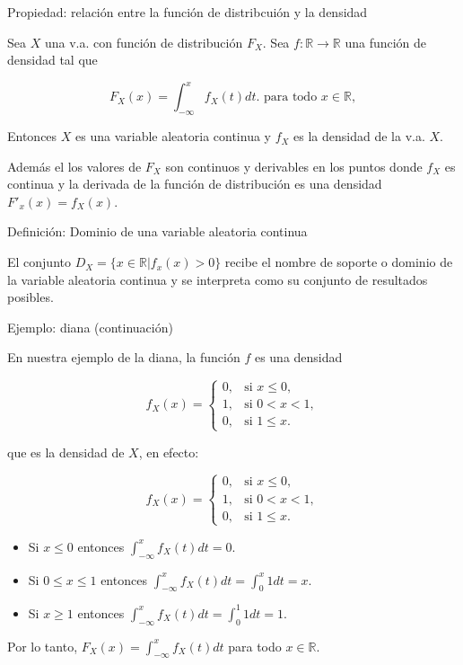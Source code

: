 \documentclass[
  letterpaper,
  DIV=11,
  numbers=noendperiod]{scrreprt}
\begin{document}
Propiedad: relación entre la función de distribcuión y la densidad

Sea \(X\) una v.a. con función de distribución \(F_X\). Sea
\(f:\mathbb{R}\to\mathbb{R}\) una función de densidad tal que

\[F_X(x)=\displaystyle\int_{-\infty}^{x} f_X(t) dt.\mbox{ para todo } x\in\mathbb{R},\]

Entonces \(X\) es una variable aleatoria continua y \(f_X\) es la
densidad de la v.a. \(X\).

Además el los valores de \(F_X\) son continuos y derivables en los
puntos donde \(f_X\) es continua y la derivada de la función de
distribución es una densidad \(F'_x(x)=f_X(x)\).

Definición: Dominio de una variable aleatoria continua

El conjunto \(D_X=\{x\in\mathbb{R}| f_x(x)>0\}\) recibe el nombre de
soporte o dominio de la variable aleatoria continua y se interpreta como
su conjunto de resultados posibles.

Ejemplo: diana (continuación)

En nuestra ejemplo de la diana, la función \(f\) es una densidad

\[
f_{X}(x)=\left\{
\begin{array}{ll}
0, & \mbox{si } x\leq 0,\\
1, & \mbox{si } 0 < x < 1,\\
0, & \mbox{si } 1\leq x.
\end{array}\right.
\]

que es la densidad de \(X\), en efecto:

\[
f_{X}(x)=\left\{
\begin{array}{ll}
0, & \mbox{si } x\leq 0,\\
1, & \mbox{si } 0 < x < 1,\\
0, & \mbox{si } 1\leq x.
\end{array}\right.
\]

\begin{itemize}
\item
  Si \(x \leq 0\) entonces
  \(\displaystyle\int_{-\infty}^x f_X(t) dt = 0.\)
\item
  Si \(0\leq x\leq 1\) entonces
  \(\displaystyle\int_{-\infty}^x f_X(t) dt = \int_0^x 1 dt = x.\)
\item
  Si \(x\geq 1\) entonces
  \(\displaystyle\int_{-\infty}^x f_X(t) dt = \int_0^1 1 dt = 1.\)
\end{itemize}

Por lo tanto, \(F_X(x)=\displaystyle\int_{-\infty}^x f_X(t) dt\) para
todo \(x\in\mathbb{R}.\)
\end{document}
